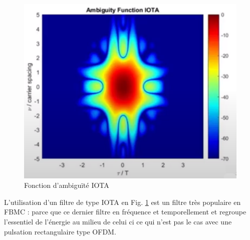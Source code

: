 \documentclass[conference]{IEEEtran}
\begin{document}
\begin{figure}[htbp]
\centerline{\includegraphics{IOTA.png}}
\caption{Fonction d'ambiguïté IOTA}
\label{IOTA}
\end{figure}

L’utilisation d’un filtre de type IOTA en Fig. \ref{IOTA} est un filtre très populaire en FBMC : parce que ce dernier filtre en fréquence et temporellement et regroupe l'essentiel de l'énergie au milieu de celui ci ce qui n'est pas le cas avec une pulsation rectangulaire type OFDM.



%      
%
\end{document}
